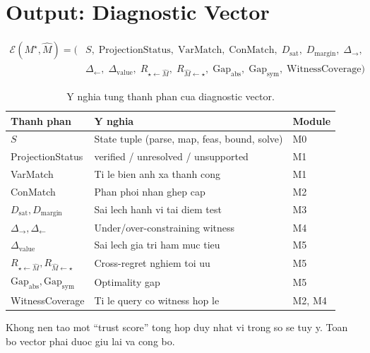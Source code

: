 \documentclass[11pt,a4paper]{article}
\begin{document}
\section{Output: Diagnostic Vector}

\begin{align*}
\mathcal{E}(M^\star, \widehat{M}) = \bigl(
  &S,\;
  \mathrm{ProjectionStatus},\;
  \mathrm{VarMatch},\;
  \mathrm{ConMatch},\;
  D_{\mathrm{sat}},\;
  D_{\mathrm{margin}},\;
  \Delta_{\to},\;\\
  &\Delta_{\leftarrow},\;
  \Delta_{\mathrm{value}},\;
  R_{\star\leftarrow\widehat{M}},\;
  R_{\widehat{M}\leftarrow\star},\;
  \mathrm{Gap}_{\mathrm{abs}},\;
  \mathrm{Gap}_{\mathrm{sym}},\;
  \mathrm{WitnessCoverage}
\bigr)
\end{align*}

\begin{table}[htbp]
\centering
\caption{Y nghia tung thanh phan cua diagnostic vector.}
\small
\begin{tabularx}{\textwidth}{L{3.5cm} Y L{2.5cm}}
\toprule
\textbf{Thanh phan} & \textbf{Y nghia} & \textbf{Module} \\
\midrule
$S$ & State tuple (parse, map, feas, bound, solve) & M0 \\
ProjectionStatus & verified / unresolved / unsupported & M1 \\
VarMatch & Ti le bien anh xa thanh cong & M1 \\
ConMatch & Phan phoi nhan ghep cap & M2 \\
$D_{\mathrm{sat}}, D_{\mathrm{margin}}$ & Sai lech hanh vi tai diem test & M3 \\
$\Delta_{\to}, \Delta_{\leftarrow}$ & Under/over-constraining witness & M4 \\
$\Delta_{\mathrm{value}}$ & Sai lech gia tri ham muc tieu & M5 \\
$R_{\star\leftarrow\widehat{M}}, R_{\widehat{M}\leftarrow\star}$ & Cross-regret nghiem toi uu & M5 \\
$\mathrm{Gap}_{\mathrm{abs}}, \mathrm{Gap}_{\mathrm{sym}}$ & Optimality gap & M5 \\
WitnessCoverage & Ti le query co witness hop le & M2, M4 \\
\bottomrule
\end{tabularx}
\end{table}

\begin{warningbox}
Khong nen tao mot ``trust score'' tong hop duy nhat vi trong so se tuy y.
Toan bo vector phai duoc giu lai va cong bo.
\end{warningbox}
\end{document}
